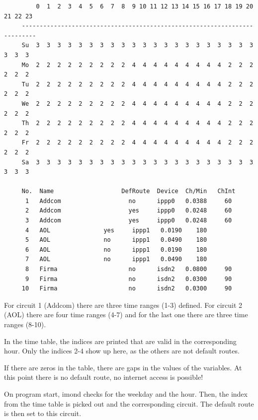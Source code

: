 \begin{example}
\begin{verbatim}
         0  1  2  3  4  5  6  7  8  9 10 11 12 13 14 15 16 17 18 19 20 21 22 23
     --------------------------------------------------------------------------
     Su  3  3  3  3  3  3  3  3  3  3  3  3  3  3  3  3  3  3  3  3  3  3  3  3
     Mo  2  2  2  2  2  2  2  2  2  4  4  4  4  4  4  4  4  4  2  2  2  2  2  2
     Tu  2  2  2  2  2  2  2  2  2  4  4  4  4  4  4  4  4  4  2  2  2  2  2  2
     We  2  2  2  2  2  2  2  2  2  4  4  4  4  4  4  4  4  4  2  2  2  2  2  2
     Th  2  2  2  2  2  2  2  2  2  4  4  4  4  4  4  4  4  4  2  2  2  2  2  2
     Fr  2  2  2  2  2  2  2  2  2  4  4  4  4  4  4  4  4  4  2  2  2  2  2  2
     Sa  3  3  3  3  3  3  3  3  3  3  3  3  3  3  3  3  3  3  3  3  3  3  3  3

     No.  Name                   DefRoute  Device  Ch/Min   ChInt
      1   Addcom                   no      ippp0   0.0388     60
      2   Addcom                   yes     ippp0   0.0248     60
      3   Addcom                   yes     ippp0   0.0248     60
      4   AOL               yes     ippp1   0.0190    180
      5   AOL               no      ippp1   0.0490    180
      6   AOL               no      ippp1   0.0190    180
      7   AOL               no      ippp1   0.0490    180
      8   Firma                    no      isdn2   0.0800     90
      9   Firma                    no      isdn2   0.0300     90
     10   Firma                    no      isdn2   0.0300     90
\end{verbatim}
\end{example}

  For circuit 1 (Addcom) there are three time ranges (1-3) defined.
  For circuit 2 (AOL) there are four time ranges (4-7) and
  for the last one there are three time ranges (8-10).

  In the time table, the indices are printed that are valid in the
  corresponding hour. Only the indices 2-4 show up here, as the others
  are not default routes.

  If there are zeros in the table, there are gaps in the values of the
   variables. At this point there is no
  default route, no internet access is possible!

  On program start, imond checks for the weekday and the hour. Then, the
  index from the time table is picked out and the corresponding circuit.
  The default route is then set to this circuit.

